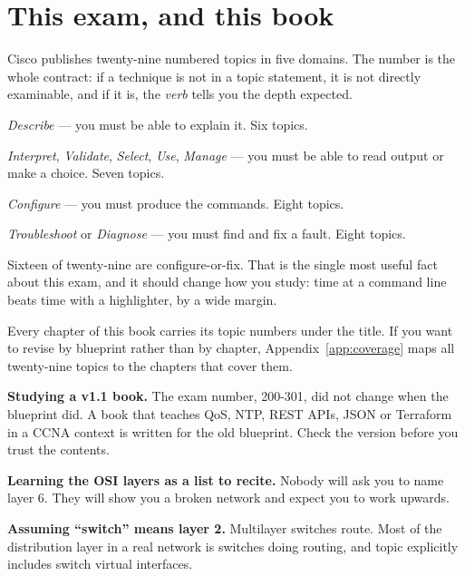 \section{This exam, and this book}

\begin{examnote}
Cisco publishes twenty-nine numbered topics in five domains. The number is the
whole contract: if a technique is not in a topic statement, it is not directly
examinable, and if it is, the \emph{verb} tells you the depth expected.

\begin{tight}
  \item \emph{Describe} --- you must be able to explain it. Six topics.
  \item \emph{Interpret}, \emph{Validate}, \emph{Select}, \emph{Use},
        \emph{Manage} --- you must be able to read output or make a choice.
        Seven topics.
  \item \emph{Configure} --- you must produce the commands. Eight topics.
  \item \emph{Troubleshoot} or \emph{Diagnose} --- you must find and fix a fault.
        Eight topics.
\end{tight}

Sixteen of twenty-nine are configure-or-fix. That is the single most useful fact
about this exam, and it should change how you study: time at a command line
beats time with a highlighter, by a wide margin.
\end{examnote}

Every chapter of this book carries its topic numbers under the title. If you want
to revise by blueprint rather than by chapter, Appendix~\ref{app:coverage} maps
all twenty-nine topics to the chapters that cover them.

\begin{pitfall}
\begin{tight}
  \item \textbf{Studying a v1.1 book.} The exam number, 200-301, did not change
        when the blueprint did. A book that teaches QoS, NTP, REST APIs, JSON or
        Terraform in a CCNA context is written for the old blueprint. Check the
        version before you trust the contents.
  \item \textbf{Learning the OSI layers as a list to recite.} Nobody will ask you
        to name layer 6. They will show you a broken network and expect you to
        work upwards.
  \item \textbf{Assuming ``switch'' means layer 2.} Multilayer switches route.
        Most of the distribution layer in a real network is switches doing
        routing, and topic  explicitly includes switch virtual
        interfaces.
\end{tight}
\end{pitfall}

